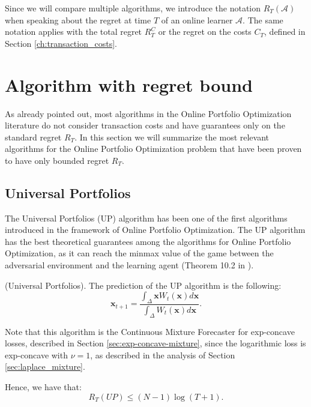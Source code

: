 Since we will compare multiple algorithms, we introduce the notation $R_T(\mathcal A)$ when speaking about the regret at time $T$ of an online learner $\mathcal A$. The same notation applies with the total regret $R_T^C$ or the regret on the costs $C_T$, defined in Section \ref{ch:transaction_costs}.

\section{Algorithm with regret bound}

As already pointed out, most algorithms in the Online Portfolio Optimization literature do not consider transaction costs and have guarantees only on the standard regret $R_T$. In this section we will summarize the most relevant algorithms for the Online Portfolio Optimization problem that have been proven to have only bounded regret $R_T$. 

\subsection{Universal Portfolios}\label{sec:UP}
The Universal Portfolios (UP) \cite{cover1996universal} algorithm has been one of the first algorithms introduced in the framework of Online Portfolio Optimization. The UP algorithm has the best theoretical guarantees among the algorithms for Online Portfolio Optimization, as it can reach the minmax value of the game between the adversarial environment and the learning agent (Theorem 10.2 in \cite{cesa2006prediction}).


\begin{definition}(Universal Portfolios).
The prediction of the UP algorithm is the following:
\begin{equation}\label{eq:UP}
\mathbf x_{t+1}=\frac{\int_{\Delta}\mathbf x W_t(\mathbf x)d\mathbf x}{\int_{\Delta} W_t(\mathbf x)d\mathbf x}.
\end{equation}
\end{definition}

Note that this algorithm is the Continuous Mixture Forecaster for exp-concave losses, described in Section \ref{sec:exp-concave-mixture}, since the logarithmic loss is exp-concave with $\nu=1$, as described in the analysis of Section \ref{sec:laplace_mixture}.

Hence, we have that: 
\begin{equation}
R_T(UP)\le(N-1)\log(T+1).
\end{equation}

